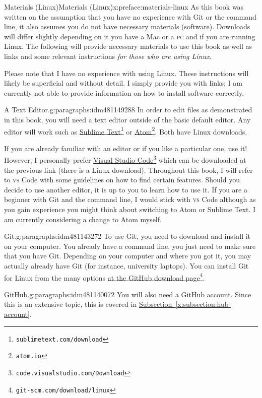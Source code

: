 \documentclass[oneside,10pt,]{book}
\newcommand{\xreffont}{\relax}
\newcommand{\initialism}[1]{\textsc{\MakeLowercase{#1}}}
\begin{document}
\begin{preface}{Materials (Linux)}{}{Materials (Linux)}{}{}{x:preface:materials-linux}
As this book was written on the assumption that you have no experience with Git or the command line, it also assumes you do not have necessary materials (software). Downloads will differ slightly depending on it you have a Mac or a \initialism{PC} and if you are running Linux. The following will provide necessary materials to use this book as well as links and some relevant instructions \emph{for those who are using Linux}.%
\par
Please note that I have no experience with using Linux. These instructions will likely be superficial and without detail. I simply provide you with links; I am currently not able to provide information on how to install software correctly.%
\begin{paragraphs}{A Text Editor.}{g:paragraphs:idm481149288}%
In order to edit files as demonstrated in this book, you will need a text editor outside of the basic default editor. Any editor will work such as \href{https://www.sublimetext.com/download}{Sublime Text}\footnote{\nolinkurl{sublimetext.com/download}\label{g:fn:idm481150824}} or \href{https://atom.io}{Atom}\footnote{\nolinkurl{atom.io}\label{g:fn:idm481145704}}. Both have Linux downloads.%
\par
If you are already familiar with an editor or if you like a particular one, use it! However, I personally prefer \href{}{Visual Studio Code}\footnote{\nolinkurl{code.visualstudio.com/Download}\label{g:fn:idm481139176}} which can be downloaded at the previous link (there is a Linux download). Throughout this book, I will refer to \initialism{VS} Code with some guidelines on how to find certain features. Should you decide to use another editor, it is up to you to learn how to use it. If you are a beginner with Git and the command line, I would stick with \initialism{VS} Code although as you gain experience you might think about switching to Atom or Sublime Text. I am currently considering a change to Atom myself.%
\end{paragraphs}%
\begin{paragraphs}{Git.}{g:paragraphs:idm481143272}%
To use Git, you need to download and install it on your computer. You already have a command line, you just need to make sure that you have Git. Depending on your computer and where you got it, you may actually already have Git (for instance, university laptops). You can install Git for Linux from the many options \href{https://git-scm.com/download/linux}{at the GitHub download page}\footnote{\nolinkurl{git-scm.com/download/linux}\label{g:fn:idm481143144}}.%
\end{paragraphs}%
\begin{paragraphs}{GitHub.}{g:paragraphs:idm481140072}%
You will also need a GitHub account. Since this is an extensive topic, this is covered in \hyperref[x:subsection:hub-account]{Subsection~{\xreffont\ref{x:subsection:hub-account}}}.%
\end{paragraphs}%
\end{preface}
\end{document}
